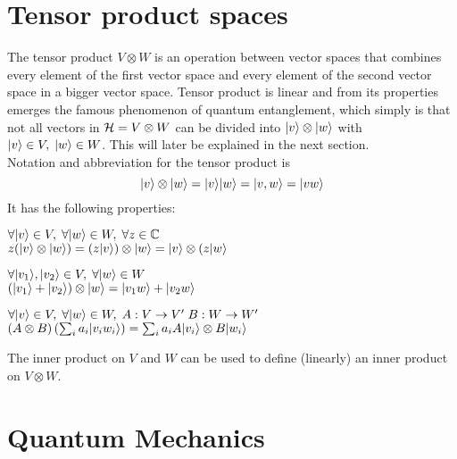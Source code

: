 	\section{Tensor product spaces}
	The tensor product $V\otimes W$ is an operation between vector spaces that combines every element of the first vector space and every element of the second vector space in a bigger vector space. Tensor product is linear and from its properties emerges the famous phenomenon of quantum entanglement, which simply is that not all vectors in $\mathcal{H} = V\otimes W$ can be divided into $|v \rangle\otimes|w \rangle$ with $|v \rangle\in V,\; |w \rangle\in W$. This will later be explained in the next section.\\
	Notation and abbreviation for the tensor product is 
	$$ |v \rangle\otimes|w \rangle = |v \rangle|w \rangle = |v,w \rangle = |vw \rangle$$
	It has the following properties:
	\begin{description}
		\item $\forall|v \rangle\in V ,\; \forall|w \rangle\in W, \; \forall z\in \mathbb{C}$	\\
					$ z(|v \rangle\otimes|w \rangle) = (z|v \rangle)\otimes|w \rangle = |v \rangle\otimes(z|w \rangle $
		\item $\forall|v_1 \rangle,|v_2 \rangle\in V ,\; \forall|w \rangle\in W$	\\
					$ (|v_1 \rangle + |v_2 \rangle)\otimes|w \rangle = |v_1w \rangle + |v_2w \rangle $
		\item $\forall|v \rangle\in V ,\; \forall|w \rangle\in W, \; A:V\rightarrow V' \; B:W\rightarrow W'$	\\
					$ (A\otimes B) \left(\sum_i a_i |v_i w_i \rangle \right) = \sum_i a_i A|v_i \rangle\otimes B|w_i \rangle $
	\end{description}
	The inner product on $V$ and $W$ can be used to define (linearly) an inner product on $V\otimes W$.	
	
\section{Quantum Mechanics}
	
	
	
